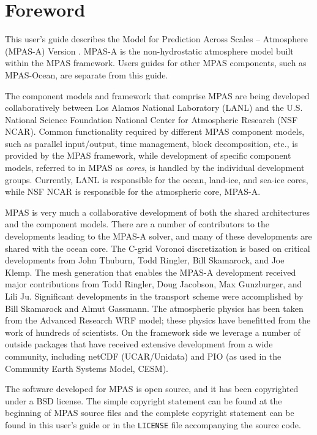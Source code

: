 \chapter*{Foreword}
\label{chap:foreword}

This user's guide describes the Model for Prediction Across Scales -- Atmosphere
(MPAS-A) Version \version.   MPAS-A is the non-hydrostatic atmosphere model
built within the MPAS framework. Users guides for other MPAS components, such as
MPAS-Ocean, are separate from this guide.

The component models and framework that comprise MPAS are being developed
collaboratively between Los Alamos National Laboratory (LANL) and the U.S.
National Science Foundation National Center for Atmospheric Research (NSF NCAR).
Common functionality required by different MPAS component models, such as
parallel input/output, time management, block decomposition, etc., is provided
by the MPAS framework, while development of specific component models, referred
to in MPAS as {\em cores}, is handled by the individual development groups.
Currently, LANL is responsible for the ocean, land-ice, and sea-ice cores, while
NSF NCAR is responsible for the atmospheric core, MPAS-A.

MPAS is very much a collaborative development of both the shared architectures
and the component models.  There are a number of contributors to the
developments leading to the MPAS-A solver, and many of these developments are
shared with the ocean core.  The C-grid Voronoi discretization is based on
critical developments from John Thuburn, Todd Ringler, Bill Skamarock, and Joe
Klemp.  The mesh generation that enables the MPAS-A development received major
contributions from Todd Ringler, Doug Jacobson, Max Gunzburger, and Lili Ju.
Significant developments in the transport scheme were accomplished by Bill
Skamarock and Almut Gassmann.  The atmospheric physics has been taken from the
Advanced Research WRF model; these physics have benefitted from the work of
hundreds of scientists.  On the framework side we leverage a number of outside
packages that have received extensive development from a wide community,
including netCDF (UCAR/Unidata) and PIO (as used in the Community Earth Systems
Model, CESM).

The software developed for MPAS is open source, and it has been copyrighted
under a BSD license.  The simple copyright statement can be found at the
beginning of MPAS source files and the complete copyright statement can be found
in this user's guide or in the {\tt LICENSE} file accompanying the source code.


